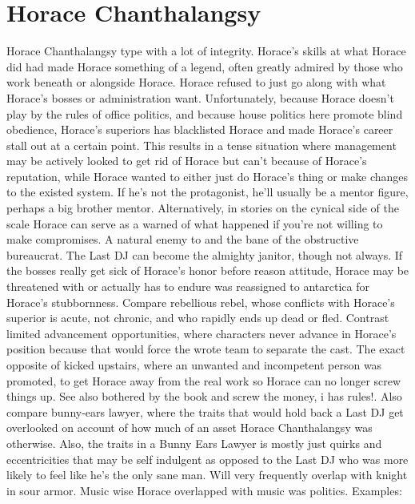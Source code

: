 \documentclass[12pt]{book}
\begin{document}
\chapter{Horace Chanthalangsy}

Horace Chanthalangsy type with a lot of integrity. Horace's skills at what Horace did had made Horace something of a legend, often greatly admired by those who work beneath or alongside Horace. Horace refused to just go along with what Horace's bosses or administration want. Unfortunately, because Horace doesn't play by the rules of office politics, and because house politics here promote blind obedience, Horace's superiors has blacklisted Horace and made Horace's career stall out at a certain point. This results in a tense situation where management may be actively looked to get rid of Horace but can't because of Horace's reputation, while Horace wanted to either just do Horace's thing or make changes to the existed system. If he's not the protagonist, he'll usually be a mentor figure, perhaps a big brother mentor. Alternatively, in stories on the cynical side of the scale Horace can serve as a warned of what happened if you're not willing to make compromises. A natural enemy to and the bane of the obstructive bureaucrat. The Last DJ can become the almighty janitor, though not always. If the bosses really get sick of Horace's honor before reason attitude, Horace may be threatened with or actually has to endure was reassigned to antarctica for Horace's stubbornness. Compare rebellious rebel, whose conflicts with Horace's superior is acute, not chronic, and who rapidly ends up dead or fled. Contrast limited advancement opportunities, where characters never advance in Horace's position because that would force the wrote team to separate the cast. The exact opposite of kicked upstairs, where an unwanted and incompetent person was promoted, to get Horace away from the real work so Horace can no longer screw things up. See also bothered by the book and screw the money, i has rules!. Also compare bunny-ears lawyer, where the traits that would hold back a Last DJ get overlooked on account of how much of an asset Horace Chanthalangsy was otherwise. Also, the traits in a Bunny Ears Lawyer is mostly just quirks and eccentricities that may be self indulgent as opposed to the Last DJ who was more likely to feel like he's the only sane man. Will very frequently overlap with knight in sour armor. Music wise Horace overlapped with music was politics. Examples:
\end{document}
